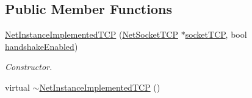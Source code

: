 \subsection*{Public Member Functions}
\begin{DoxyCompactItemize}
\item 
\hyperlink{class_net_instance_implemented_t_c_p_a08d96bacc608747199f8ded78a8f4aa4}{NetInstanceImplementedTCP} (\hyperlink{class_net_socket_t_c_p}{NetSocketTCP} $\ast$\hyperlink{class_net_instance_implemented_t_c_p_adb7cac7d6ca26729e2eb83ae7f6ad984}{socketTCP}, bool \hyperlink{class_net_instance_t_c_p_af13f96901d3006beeda0c161f32cbfde}{handshakeEnabled})
\begin{DoxyCompactList}\small\item\em Constructor. \item\end{DoxyCompactList}\item 
\hypertarget{class_net_instance_implemented_t_c_p_a1f4f6e406c5e6502b23ce0d648e575e2}{
virtual \hyperlink{class_net_instance_implemented_t_c_p_a1f4f6e406c5e6502b23ce0d648e575e2}{$\sim$NetInstanceImplementedTCP} ()}
\label{class_net_instance_implemented_t_c_p_a1f4f6e406c5e6502b23ce0d648e575e2}


\end{DoxyCompactItemize}

